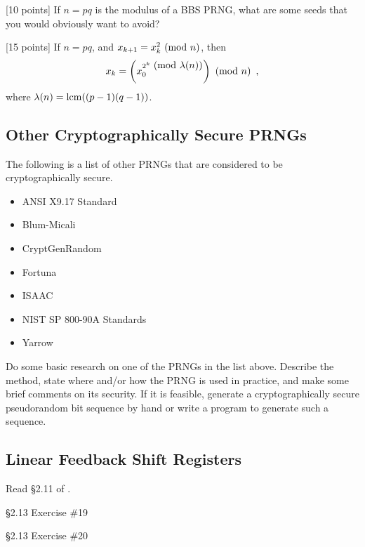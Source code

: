 \begin{problem}
\label{prob:bbs5}  [10 points]
If $n=pq$ is the modulus of a BBS PRNG, what are some seeds that you would obviously want to avoid?
\end{problem}

\begin{problem}
\label{prob:bbs6} [15 points]
If $n = pq$, and $x_{k+1} = x_k^2\mbox{\ $\left(\mathrm{mod}\ {n}\right)$}$, then
$$x_k = \left(x_0^{2^k\mbox{\ $\left(\mathrm{mod}\ {\lambda(n)}\right)$}}\right)\mbox{\ $\left(\mathrm{mod}\ {n}\right)$} \enspace ,$$
where $\lambda(n) = \operatorname{lcm}((p-1)(q-1))$.
\end{problem}

		\subsection{Other Cryptographically Secure PRNGs}

	The following is a list of other PRNGs that are considered to be cryptographically secure.

		\begin{itemize}
			\item ANSI X9.17 Standard
			\item Blum-Micali
			\item CryptGenRandom
			\item Fortuna
			\item ISAAC
			\item NIST SP 800-90A Standards
			\item Yarrow
		\end{itemize}

\begin{problem} [15 points]
	Do some basic research on one of the PRNGs in the list above. Describe the method, state where and/or how the PRNG is used in practice, and make some brief comments on its security. If it is feasible, generate a cryptographically secure pseudorandom bit sequence by hand or write a program to generate such a sequence.
\end{problem}

		\subsection{Linear Feedback Shift Registers}

		Read \S 2.11 of \cite{tw}.

\begin{problem} [10 points]
\S 2.13 Exercise \#19
\end{problem}

\begin{problem} [10 points]
\S 2.13 Exercise \#20
\end{problem}

